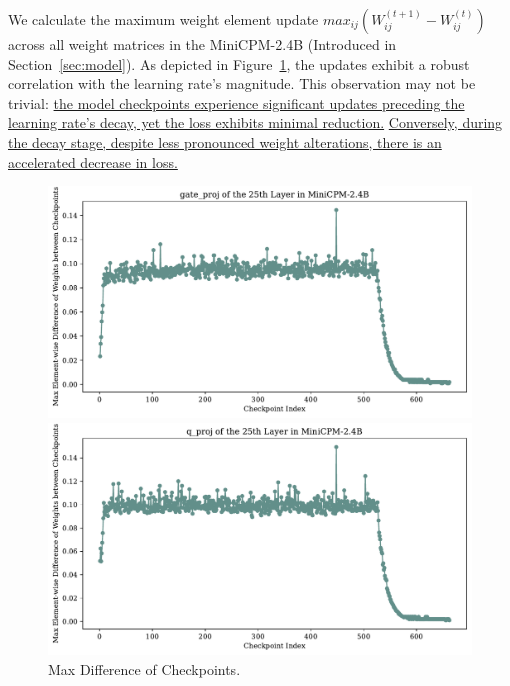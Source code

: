 We calculate the maximum weight element update $max_{ij} (W_{ij}^{(t+1)} - W_{ij}^{(t)})$ across all weight matrices in the MiniCPM-2.4B (Introduced in Section~\ref{sec:model}). As depicted in Figure~\ref{fig:appmaxdiff}, the updates exhibit a robust correlation with the learning rate's magnitude. This observation may not be trivial: \uline{the model checkpoints experience significant updates preceding the learning rate's decay, yet the loss exhibits minimal reduction.} \uline{Conversely, during the decay stage, despite less pronounced weight alterations, there is an accelerated decrease in loss.}

\begin{figure}[htbp]
    \centering
    \begin{minipage}{0.48\linewidth}
        \centering
        \includegraphics[width=1.0\linewidth]{Fig/gate_proj_projection_vs_rank_25.pdf}
    \end{minipage}
    \hfill %
    \begin{minipage}{0.48\linewidth}
        \centering
        \includegraphics[width=1.0\linewidth]{Fig/q_proj_projection_vs_rank_25.pdf}
    \end{minipage}
     \caption{Max Difference of Checkpoints.}
        \label{fig:appmaxdiff}
\end{figure}

